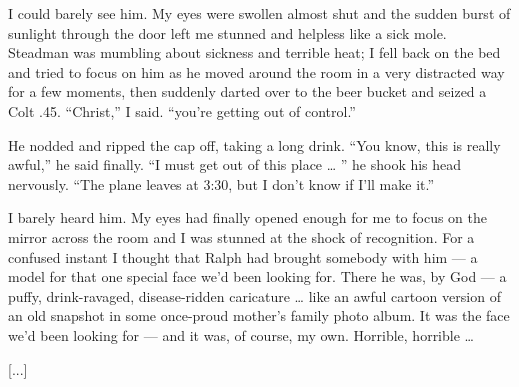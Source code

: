\documentclass[9pt,a4paper]{extarticle}
\begin{document}
I could barely see him. My eyes were swollen almost shut and the sudden burst of sunlight through the door left me stunned and helpless like a sick mole. Steadman was mumbling about sickness and terrible heat; I fell back on the bed and tried to focus on him as he moved around the room in a very distracted way for a few moments, then suddenly darted over to the beer bucket and seized a Colt .45. “Christ,” I said. “you’re getting out of control.”

He nodded and ripped the cap off, taking a long drink. “You know, this is really awful,” he said finally. “I must get out of this place … ” he shook his head nervously. “The plane leaves at 3:30, but I don’t know if I’ll make it.”

I barely heard him. My eyes had finally opened enough for me to focus on the mirror across the room and I was stunned at the shock of recognition. For a confused instant I thought that Ralph had brought somebody with him — a model for that one special face we’d been looking for. There he was, by God — a puffy, drink-ravaged, disease-ridden caricature … like an awful cartoon version of an old snapshot in some once-proud mother’s family photo album. It was the face we’d been looking for — and it was, of course, my own. Horrible, horrible …

[...]
\end{document}
